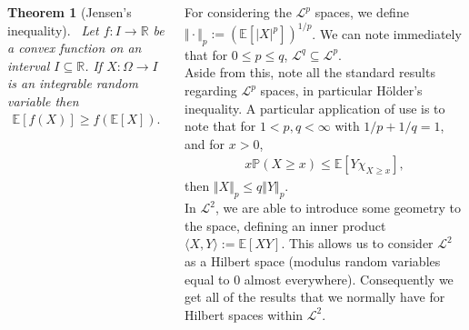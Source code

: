 \documentclass{tikzposter} %
\newtheorem{theorem}{Theorem}
\newtheorem{definition}{Definition}
\begin{document}
\begin{columns}
{{    \begin{theorem}[Jensen's inequality]
      \ Let $f : I \to \mathbb{R}$ be a convex function on an interval $I \subseteq \mathbb{R}$. If $X : \Omega \to I$ is an integrable random variable then
      \begin{align*}
        \mathbb{E}[f(X)] \ge f(\mathbb{E}[X]).
      \end{align*}
    \end{theorem}
    \hphantom{}
    }

    For considering the $\mathcal{L}^{p}$ spaces, we define $\Vert \cdot \Vert_{p} := \left(\mathbb{E}[|X|^{p}]\right)^{1/p}$. We can note immediately that for $0 \le p \le q$, $\mathcal{L}^{q} \subseteq \mathcal{L}^{p}$. \\

    Aside from this, note all the standard results regarding $\mathcal{L}^{p}$ spaces, in particular H\"{o}lder's inequality. A particular application of use is to note that for $1 < p, q < \infty$ with $1/p+1/q = 1$, and for $x > 0$,
    \begin{align*}
      x \mathbb{P}(X \ge x) \le \mathbb{E}[Y \chi_{X \ge x}],
    \end{align*}
    then $\Vert X \Vert_{p} \le q \Vert Y \Vert_{p}$. \\

    In $\mathcal{L}^{2}$, we are able to introduce some geometry to the space, defining an inner product $\langle X, Y \rangle := \mathbb{E}[XY]$. This allows us to consider $\mathcal{L}^{2}$ as a Hilbert space (modulus random variables equal to $0$ almost everywhere). Consequently we get all of the results that we normally have for Hilbert spaces within $\mathcal{L}^{2}$.
  }

\end{columns}
\end{document}
